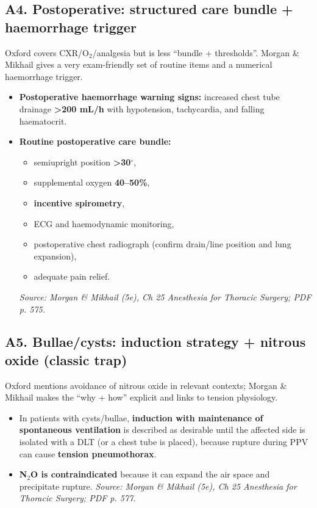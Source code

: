 \documentclass[11pt,a4paper]{article}
\begin{document}
\subsection{A4. Postoperative: structured care bundle + haemorrhage trigger}
Oxford covers CXR/O\(_2\)/analgesia but is less “bundle + thresholds”. Morgan \& Mikhail gives a very exam-friendly set of routine items and a numerical haemorrhage trigger.

\begin{itemize}[leftmargin=*, itemsep=2pt]
  \item \textbf{Postoperative haemorrhage warning signs:} increased chest tube drainage \textbf{>200 mL/h} with hypotension, tachycardia, and falling haematocrit.
  \item \textbf{Routine postoperative care bundle:}
  \begin{itemize}[leftmargin=*, itemsep=2pt]
    \item semiupright position \textbf{>30\(^\circ\)},
    \item supplemental oxygen \textbf{40--50\%},
    \item \textbf{incentive spirometry},
    \item ECG and haemodynamic monitoring,
    \item postoperative chest radiograph (confirm drain/line position and lung expansion),
    \item adequate pain relief.
  \end{itemize}
  \emph{Source: Morgan \& Mikhail (5e), Ch 25 Anesthesia for Thoracic Surgery; PDF p. 575.}
\end{itemize}

\subsection{A5. Bullae/cysts: induction strategy + nitrous oxide (classic trap)}
Oxford mentions avoidance of nitrous oxide in relevant contexts; Morgan \& Mikhail makes the “why + how” explicit and links to tension physiology.

\begin{itemize}[leftmargin=*, itemsep=2pt]
  \item In patients with cysts/bullae, \textbf{induction with maintenance of spontaneous ventilation} is described as desirable until the affected side is isolated with a DLT (or a chest tube is placed), because rupture during PPV can cause \textbf{tension pneumothorax}.
  \item \textbf{N\(_2\)O is contraindicated} because it can expand the air space and precipitate rupture.
  \emph{Source: Morgan \& Mikhail (5e), Ch 25 Anesthesia for Thoracic Surgery; PDF p. 577.}
\end{itemize}
\end{document}

